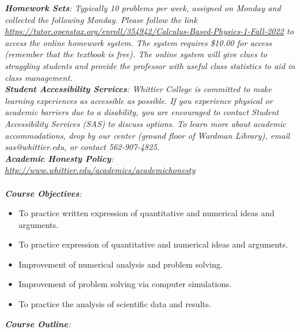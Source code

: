 \documentclass[10pt]{article}
\begin{document}
\noindent
\textit{\textbf{Homework Sets}: Typically 10 problems per week, assigned on Monday and collected the following Monday. Please follow the link \url{https://tutor.openstax.org/enroll/354942/Calculus-Based-Physics-1-Fall-2022} to access the online homework system. The system requires \$10.00 for access (remember that the textbook is free). The online system will give clues to struggling students and provide the professor with useful class statistics to aid in class management.} \\
\textit{\textbf{Student Accessibility Services}: Whittier College is committed to make learning experiences as accessible as possible. If you experience physical or academic barriers due to a disability, you are encouraged to contact Student Accessibility Services (SAS) to discuss options. To learn more about academic accommodations, drop by our center (ground floor of Wardman Library), email sas@whittier.edu, or contact 562-907-4825.} \\
\textit{\textbf{Academic Honesty Policy}: \url{http://www.whittier.edu/academics/academichonesty}} \\ \\
\textit{\textbf{Course Objectives}:}
\begin{itemize}
\item To practice written expression of quantitative and numerical ideas and arguments.
\item To practice expression of quantitative and numerical ideas and arguments.
\item Improvement of numerical analysis and problem solving.
\item Improvement of problem solving via computer simulations.
\item To practice the analysis of scientific data and results.
\end{itemize}
\clearpage
\textit{\textbf{Course Outline}:}
\end{document}
